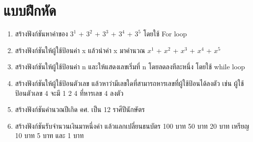 \section{แบบฝึกหัด}
\begin{enumerate} 

\item 	สร้างฟังก์ชันหาค่าของ  $3^1$ + $3^2$ + $3^3$ + $3^4$ + $3^5$  โดยใช้ For loop
\item 	สร้างฟังก์ชันให้ผู้ใช้ป้อนค่า x แล้วนำค่า x มาคำนวณ $x^1$ + $x^2$ + $x^3$ + $x^4$ + $x^5$
\item 	สร้างฟังก์ชันให้ผู้ใช้ป้อนค่า n และให้แสดงเลขเริ่มที่ n โดยลดลงทีละหนึ่ง โดยใช้ while loop
\item 	สร้างฟังก์ชันให้ผู้ใช้ป้อนตัวเลข แล้วหาว่ามีเลขใดที่สามารถหารเลขที่ผู้ใช้ป้อนได้ลงตัว เช่น ผู้ใช้ป้อนตัวเลข 4 จะมี 1 2 4 ที่หารเลข 4 ลงตัว
\item 	สร้างฟังก์ชันคำนวณปีเกิด คศ. เป็น 12 ราศีปีนักษัตร
\item 	สร้างฟังก์ชันรับจำนวนเงินมาหนึ่งค่า แล้วแลกเปลี่ยนธนบัตร 100 บาท 50 บาท 20 บาท เหรียญ 10 บาท 5 บาท และ 1 บาท
\end{enumerate}